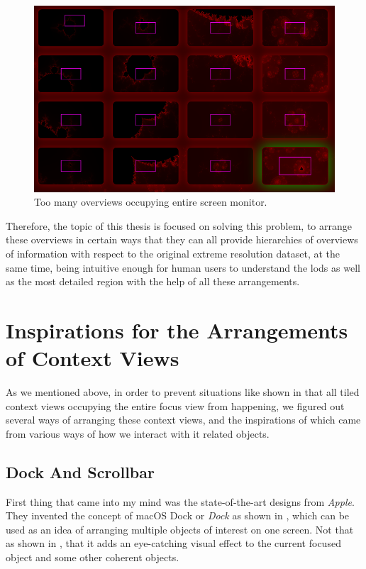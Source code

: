 \begin{figure}[H]
\centering
\includegraphics[width=\textwidth,keepaspectratio]{Figures/Chapter1/occupiesscreen.png}
\decoRule
\caption[Occupied Screen]{Too many overviews occupying entire screen monitor.}
\label{fig:occupiesscreen}
\end{figure}

Therefore, the topic of this thesis is focused on solving this problem, to arrange these overviews in certain ways that they can all provide hierarchies of overviews of information with respect to the original extreme resolution dataset, at the same time, being intuitive enough for human users to understand the \glspl{lod} as well as the most detailed region with the help of all these arrangements.

\section{Inspirations for the Arrangements of Context Views}


As we mentioned above, in order to prevent situations like shown in  that all tiled context views occupying the entire focus view from happening, we figured out several ways of arranging these context views, and the inspirations of which came from various ways of how we interact with \gls{it} related objects.

\subsection{Dock And Scrollbar}

First thing that came into my mind was the state-of-the-art designs from \emph{Apple}. They invented the concept of macOS Dock or \emph{Dock} as shown in , which can be used as an idea of arranging multiple objects of interest on one screen. Not that as shown in , that it adds an eye-catching visual effect to the current focused object and some other coherent objects.


